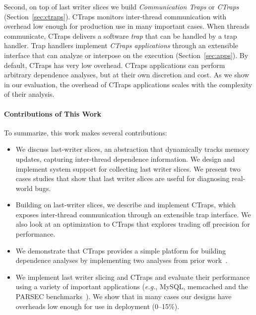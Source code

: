 \documentclass[preprint,9pt]{sigplanconf}
\newcommand{\ctraps}{CTraps\xspace}
\begin{document}
Second, on top of last writer slices we build {\em Communication Traps} or {\em
\ctraps}  (Section~\ref{sec:ctraps}).  \ctraps monitors inter-thread
communication with overhead low enough for production use in many important
cases.  When threads communicate, \ctraps delivers a software {\em trap} that can be
handled by a trap handler.  Trap handlers implement {\em \ctraps applications}
through an extensible interface that can analyze or interpose on the execution
(Section~\ref{sec:apps}).  By default, \ctraps has very low overhead.  \ctraps
applications can perform arbitrary dependence analyses, but at their own
discretion and cost.  As we show in our evaluation, the overhead of \ctraps
applications scales with the complexity of their analysis.

\paragraph{Contributions of This Work}
To summarize, this work makes several contributions:
\begin{itemize}

\item{We discuss last-writer slices, an abstraction that dynamically tracks
memory updates, capturing inter-thread dependence information.  We
design and implement system support for collecting last writer slices.  We
present two cases studies that show that last writer slices are useful for
diagnosing real-world bugs.}

\item{Building on last-writer slices, we describe and implement \ctraps, which
exposes inter-thread communication through an extensible trap interface.
We also look at an optimization to \ctraps that explores trading off
precision for performance.}

\item{We demonstrate that \ctraps provides a simple platform for building
dependence analyses by implementing two analyses from prior
work~\cite{cci,defuse,recon}. }

\item{We implement last writer slicing and \ctraps and evaluate their performance using a
variety of important applications ({\em e.g.}, MySQL, memcached and the PARSEC
benchmarks~\cite{parsec}).  We show that in many cases our designs have overheads
low enough for use in deployment (0--15\%).}

\end{itemize}
\end{document}
